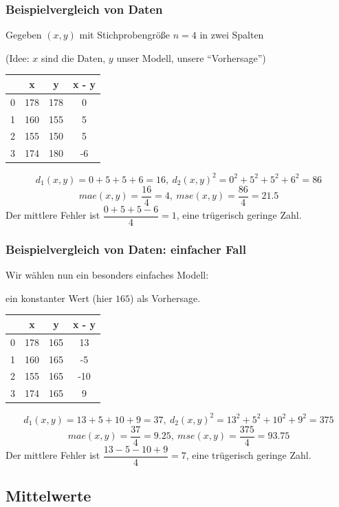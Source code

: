   \begin{frame}
    \frametitle{Beispielvergleich von Daten}
    Gegeben $(x,y)$ mit Stichprobengröße $n=4$ in zwei Spalten
    
    (Idee: $x$ sind die Daten, $y$ unser Modell, unsere ``Vorhersage'')
    
    \begin{tabular}{|c|c|c|c|}
     \hline
       & x & y & x - y\\ \hline
     0 & 178 & 178 & 0 \\
     1 & 160 & 155 & 5\\
     2 & 155 & 150 & 5\\
     3 & 174 & 180 & -6\\ \hline
    \end{tabular}

    \[d_1(x,y) = 0+5+5+6 = 16,\ d_2(x,y)^2 = 0^2+5^2+5^2+6^2 = 86\]
    \[mae(x,y) = \dfrac{16}{4} = 4,\ mse(x,y) = \dfrac{86}{4} = 21.5\]
    Der mittlere Fehler ist $\dfrac{0+5+5-6}{4} = 1$, eine trügerisch geringe Zahl.
  \end{frame}

  \begin{frame}
    \frametitle{Beispielvergleich von Daten: einfacher Fall}
    Wir wählen nun ein besonders einfaches Modell:

    ein konstanter Wert (hier $165$) als Vorhersage.
    
    \begin{tabular}{|c|c|c|c|}
     \hline
       & x & y & x - y\\ \hline
     0 & 178 & 165 & 13 \\
     1 & 160 & 165 & -5\\
     2 & 155 & 165 & -10\\
     3 & 174 & 165 & 9\\ \hline
    \end{tabular} 

    \[d_1(x,y) = 13+5+10+9 = 37,\ d_2(x,y)^2 = 13^2+5^2+10^2+9^2 = 375\]
    \[mae(x,y) = \dfrac{37}{4} = 9.25,\ mse(x,y) = \dfrac{375}{4} = 93.75\]
    Der mittlere Fehler ist $\dfrac{13-5-10+9}{4} = 7$, eine trügerisch geringe Zahl.
  \end{frame}

\subsection{Mittelwerte}
  
